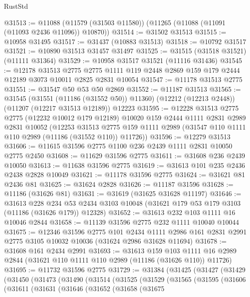 \begin{lexlean}{RustStd}
\begin{coremodule}
@31513 := @11088 (@11579 (@31503 @11580)) (@11265 (@11088 (@11091 (@11093 @2436 @11096)) @10870))
@31514 := @31502 @31513
@31515 := @10958 @31495
@31517 := @31437 (@10883 @31513)
@31518 := @10792 @31517
@31521 := @10890 @31513 @31457 @31497
@31525 := @31515 (@31518 @31521) (@11111 @31364)
@31529 := @10958 @31517 @31521 (@11116 @31436)
@31545 := @12178
    @31513
    @2775
    @2775
    @1111
    @119
    @2448
    @2869
    @159
    @179
    @2444
    @12189
    @3073
    @10011
    @2825
    @2831
    @10054
@31547 := @11178 @31513 @2775
@31551 := @31547 @50 @53 @50 @2869
@31552 := @11187 @31513
@31565 := @31545
    (@31551 (@11186 (@31552 @50)) @11360)
    (@12212 (@12213 @2448))
    (@11207 (@12217 @31513 @12189))
    @12223
@31595 := @12228
    @31513
    @2775
    @2775
    (@12232 @10012 @179 @12189)
    @10020
    @159
    @2444
    @1111
    @2831
    @2989
    @2831
    @10052
    (@12253
      @31513
      @2775
      @159
      @1111
      @2989
      (@31547 @110 @1111 @110 @2989 (@11186 (@31552 @110)) @11726))
@31596 := @12279 @31513
@31606 := @11615 @31596 @2775 @1100 @236 @2439 @1111 @2831 @10050 @2775 @2450
@31608 := @11629 @31596 @2775
@31611 := @31608 @236 @2439 @10050
@31613 := @11638 @31596 @2775
@31619 := @31613 @101 @235 @2436 @2438 @2828 @10049
@31621 := @11178 @31596 @2775
@31624 := @31621 @81 @2436 @81
@31625 := @31624 @2828
@31626 := @11187 @31596
@31628 := @11186 (@31626 @81)
@31631 := @31619 (@31625 @31628 @11197)
@31646 := @31613
    @228
    @234
    @53
    @2434
    @3103
    @10048
    (@31621 @179 @53 @179 @3103 (@11186 (@31626 @179)) @12328)
@31652 := @31613 @232 @103 @1111 @16 @10046 @2844
@31658 := @11139 @31596 @2775 @232 @1111 @10040 @10044
@31675 := @12346
    @31596
    @2775
    @101
    @2434
    @1111
    @2986
    @161
    @2831
    @2991
    @2775
    @3105
    @10032
    @10036
    (@31624 @2986 @31628 @11694)
@31678 := @31608 @161 @2434 @2991
@31693 := @31613
    @159
    @103
    @1111
    @16
    @2989
    @2844
    (@31621 @110 @1111 @110 @2989 (@11186 (@31626 @110)) @11726)
@31695 := @11732 @31596 @2775
@31729 := @31384
    (@31425
      (@31427
        (@31429
          (@31450
            (@31473
              (@31490
                (@31514
                  (@31525
                    (@31529
                      (@31565
                        (@31595
                          (@31606
                            (@31611
                              (@31631
                                (@31646
                                  (@31652
                                    (@31658
                                      (@31675

\end{coremodule}
\end{lexlean}
